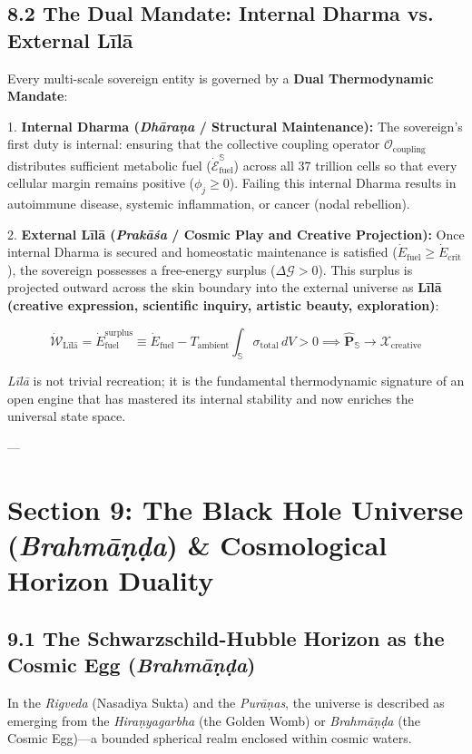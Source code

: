 \documentclass[11pt,a4paper]{article}
\theoremstyle{definition}
\theoremstyle{remark}
\begin{document}
\subsection{8.2 The Dual Mandate: Internal Dharma vs. External Līlā}
Every multi-scale sovereign entity is governed by a \textbf{Dual Thermodynamic Mandate}:

1. \textbf{Internal Dharma (\textit{Dhāraṇa} / Structural Maintenance):}  
   The sovereign's first duty is internal: ensuring that the collective coupling operator $\mathcal{O}_{\text{coupling}}$ distributes sufficient metabolic fuel ($\dot{\mathcal{E}}_{\text{fuel}}^{\mathbb{S}}$) across all 37 trillion cells so that every cellular margin remains positive ($\phi_j \ge 0$). Failing this internal Dharma results in autoimmune disease, systemic inflammation, or cancer (nodal rebellion).

2. \textbf{External Līlā (\textit{Prakāśa} / Cosmic Play and Creative Projection):}  
   Once internal Dharma is secured and homeostatic maintenance is satisfied ($\dot{E}_{\text{fuel}} \ge \dot{E}_{\text{crit}}$), the sovereign possesses a free-energy surplus ($\Delta \mathcal{G} > 0$). This surplus is projected outward across the skin boundary into the external universe as \textbf{Līlā (creative expression, scientific inquiry, artistic beauty, exploration)}:
   
\begin{equation}
\boxed{\dot{\mathcal{W}}_{\text{Līlā}} = \dot{E}_{\text{fuel}}^{\text{surplus}} \equiv \dot{E}_{\text{fuel}} - T_{\text{ambient}} \int_{\mathbb{S}} \sigma_{\text{total}} \, dV > 0 \implies \hat{\mathbf{P}}_{\mathbb{S}} \longrightarrow \boldsymbol{\mathcal{X}}_{\text{creative}}}
\end{equation}

   \textit{Līlā} is not trivial recreation; it is the fundamental thermodynamic signature of an open engine that has mastered its internal stability and now enriches the universal state space.

---

\section{Section 9: The Black Hole Universe (\textit{Brahmāṇḍa}) \& Cosmological Horizon Duality}

\subsection{9.1 The Schwarzschild-Hubble Horizon as the Cosmic Egg (\textit{Brahmāṇḍa})}
In the \textit{Rigveda} (Nasadiya Sukta) and the \textit{Purāṇas}, the universe is described as emerging from the \textit{Hiraṇyagarbha} (the Golden Womb) or \textit{Brahmāṇḍa} (the Cosmic Egg)—a bounded spherical realm enclosed within cosmic waters. 
\end{document}
